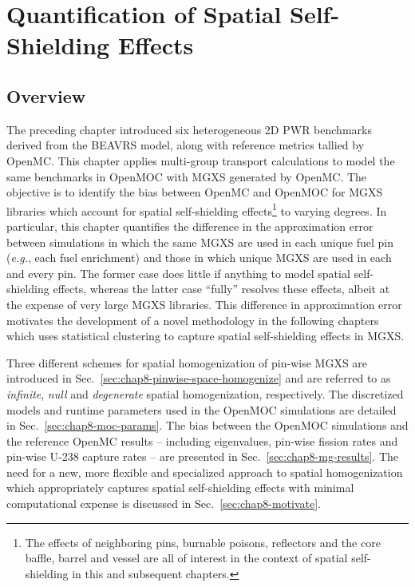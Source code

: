 \chapter{Quantification of Spatial Self-Shielding Effects}
\label{chap:quantify}


\section{Overview}
\label{sec:chap8-overview}

The preceding chapter introduced six heterogeneous 2D \ac{PWR} benchmarks derived from the \ac{BEAVRS} model, along with reference metrics tallied by OpenMC. This chapter applies multi-group transport calculations to model the same benchmarks in OpenMOC with \ac{MGXS} generated by OpenMC. The objective is to identify the bias between OpenMC and OpenMOC for \ac{MGXS} libraries which account for spatial self-shielding effects\footnote{The effects of neighboring pins, burnable poisons, reflectors and the core baffle, barrel and vessel are all of interest in the context of spatial self-shielding in this and subsequent chapters.} to varying degrees. In particular, this chapter quantifies the difference in the approximation error between simulations in which the same \ac{MGXS} are used in each unique fuel pin (\textit{e.g.}, each fuel enrichment) and those in which unique \ac{MGXS} are used in each and every pin. The former case does little if anything to model spatial self-shielding effects, whereas the latter case ``fully'' resolves these effects, albeit at the expense of very large \ac{MGXS} libraries. This difference in approximation error motivates the development of a novel methodology in the following chapters which uses statistical clustering to capture spatial self-shielding effects in \ac{MGXS}.

Three different schemes for spatial homogenization of pin-wise \ac{MGXS} are introduced in Sec.~\ref{sec:chap8-pinwise-space-homogenize} and are referred to as \textit{infinite}, \textit{null} and \textit{degenerate} spatial homogenization, respectively. The discretized models and runtime parameters used in the OpenMOC simulations are detailed in Sec.~\ref{sec:chap8-moc-params}. The bias between the OpenMOC simulations and the reference OpenMC results -- including eigenvalues, pin-wise fission rates and pin-wise U-238 capture rates -- are presented in Sec.~\ref{sec:chap8-mg-results}. The need for a new, more flexible and specialized approach to spatial homogenization which appropriately captures spatial self-shielding effects with minimal computational expense is discussed in Sec.~\ref{sec:chap8-motivate}.


